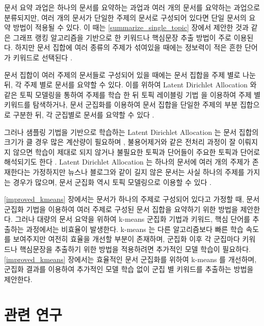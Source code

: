 \documentclass[oneside, ko,phd]{snuthesis_utf8_kor}
\begin{document}
문서 요약 과업은 하나의 문서를 요약하는 과업과 여러 개의 문서를 요약하는 과업으로 분류되지만, 여러 개의 문서가 단일한 주제의 문서로 구성되어 있다면 단일 문서의 요약 방법이 적용될 수 있다.
이 때는 \ref{summarize_single_topic} 장에서 제안한 것과 같은 그래프 랭킹 알고리즘을 기반으로 한 키워드나 핵심문장 추출 방법이 주로 이용된다.
하지만 문서 집합에 여러 종류의 주제가 섞여있을 때에는 정보력이 적은 흔한 단어가 키워드로 선택된다 \cite{goldstein2000multi, lin2002single, filippova2008sentence, filippova2010multi}.

문서 집합이 여러 주제의 문서들로 구성되어 있을 때에는 문서 집합을 주제 별로 나눈 뒤, 각 주제 별로 문서를 요약할 수 있다.
이를 위하여 Latent Dirichlet Allocation \cite{blei2003latent} 와 같은 토픽 모델링을 통하여 주제를 학습 한 뒤 토픽 레이블링 기법 \cite{sievert2014ldavis} 을 이용하여 주제 별 키워드를 탐색하거나, 문서 군집화를 이용하여 문서 집합을 단일한 주제의 부분 집합으로 구분한 뒤, 각 군집별로 문서를 요약할 수 있다 \cite{wan2008multi, erkan2004lexpagerank, twinandilla2018multi}.

그러나 샘플링 기법을 기반으로 학습하는 Latent Dirichlet Allocation 는 문서 집합의 크기가 클 경우 많은 계산량이 필요하며 \cite{yuan2015lightlda}, 불용어제거와 같은 전처리 과정이 잘 이뤄지지 않으면 학습이 제대로 되지 않거나 불필요한 토픽과 단어들이 주요한 토픽과 단어로 해석되기도 한다 \cite{darling2011theoretical, newman2010evaluating}.
Latent Dirichlet Allocation 는 하나의 문서에 여러 개의 주제가 존재한다는 가정하지만 뉴스나 블로그와 같이 길지 않은 문서는 사실 하나의 주제를 가지는 경우가 많으며, 문서 군집화 역시 토픽 모델링으로 이용할 수 있다 \cite{dhillon2001concept, xu2003document, xie2013integrating}.

\ref{improved_kmeans} 장에서는 문서가 하나의 주제로 구성되어 있다고 가정할 때, 문서 군집화 기법을 이용하여 여러 주제로 구성된 문서 집합을 요약하기 위한 방법을 제안한다.
그러나 대량의 문서 요약을 위하여 k-means 군집화 기법과 키워드, 핵심 단어를 추출하는 과정에서는 비효율이 발생한다.
k-means 는 다른 알고리즘보다 빠른 학습 속도를 보여주지만 여전히 효율을 개선할 부분이 존재하며, 군집화 이후 각 군집마다 키워드나 핵심문장을 추출하기 위한 방법을 적용하려면 추가적인 모델 학습이 필요하다.
\ref{improved_kmeans} 장에서는 효율적인 문서 군집화를 위하여 k-means 를 개선하며, 군집화 결과를 이용하여 추가적인 모델 학습 없이 군집 별 키워드를 추출하는 방법을 제안한다.

\section{관련 연구}
\end{document}
